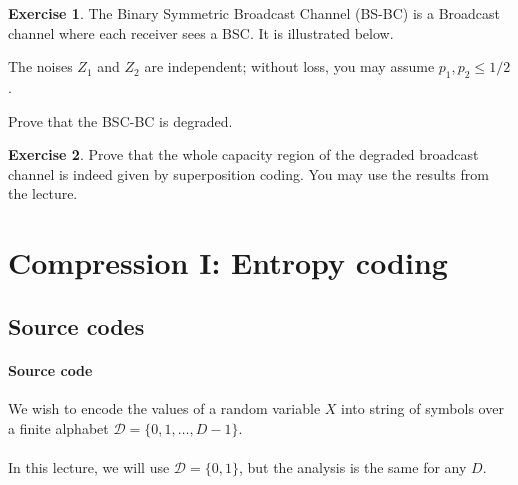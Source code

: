 \documentclass[a4paper, 11pt, openany]{book}
\numberwithin{equation}{section}
\theoremstyle{plain}
\theoremstyle{definition}
\newtheorem{exercise}   {Exercise}  [section]
\newcommand{\alphabet}[1]{\mathcal{#1}}
\begin{document}
\begin{exercise}
The Binary Symmetric Broadcast Channel (BS-BC) is a Broadcast channel where each receiver sees a BSC. It is illustrated below.

\begin{center}
\end{center}

The noises $Z_1$ and $Z_2$ are independent; without loss, you may assume $p_1, p_2 \le 1/2$.

Prove that the BSC-BC is degraded.
\end{exercise}



\begin{exercise}
Prove that the whole capacity region of the degraded broadcast channel is indeed given by  superposition coding. You may use the results from the lecture.
\end{exercise}





\section{Compression I: Entropy coding}
\label{sec:35}



\subsection{Source codes}

\paragraph{Source code}

We wish to encode the values of a random variable $X$ into string of symbols over a finite alphabet $\alphabet{D} = \{0,1,\ldots,D-1\}$.\\
~\\
In this lecture, we will use $\alphabet{D} = \{0,1\}$, but the analysis is the same for any $D$.
\end{document}
